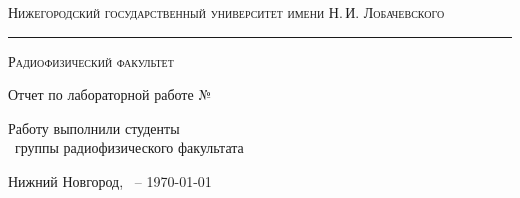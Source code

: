 
\begin{titlepage}
\begin{center}

{\small\textsc{Нижегородский государственный университет имени Н.\,И. Лобачевского}}
\vskip 2pt \hrule \vskip 3pt
{\small\textsc{Радиофизический факультет}}

\vfill


{{\large Отчет по лабораторной работе №\labnumber}\vskip 12pt {\LARGE \bfseries \labtheme}}

	
\vspace{2cm}
{\large Работу выполнили студенты \\[-0.25em] \labgroup\  группы радиофизического факультата \\[0.5em] {\Large \bfseries \labauthors}}


\end{center}

\vfill
	

	
\begin{center}
	{Нижний Новгород, \labstartdate\ -- \today}
\end{center}

\end{titlepage}
